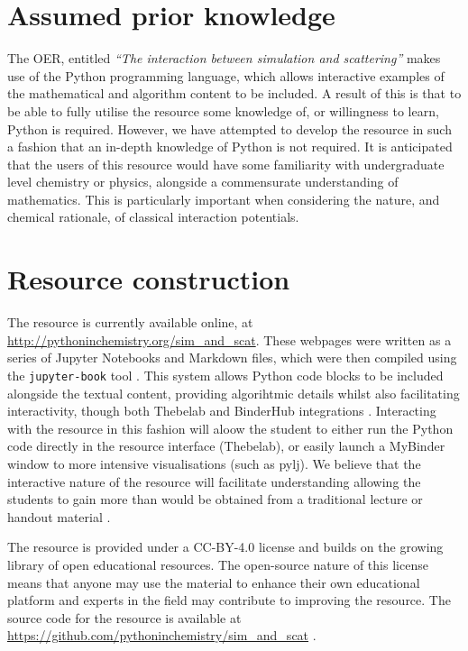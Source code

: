 \documentclass[amsmath,amssymb,twocolumn,superscriptaddress]{revtex4-1}
\begin{document}
\section{Assumed prior knowledge}

The OER, entitled \emph{``The interaction between simulation and scattering''} makes use of the Python programming language, which allows interactive examples of the mathematical and algorithm content to be included.
A result of this is that to be able to fully utilise the resource some knowledge of, or willingness to learn, Python is required.
However, we have attempted to develop the resource in such a fashion that an in-depth knowledge of Python is not required.
It is anticipated that the users of this resource would have some familiarity with undergraduate level chemistry or physics, alongside a commensurate understanding of mathematics.
This is particularly important when considering the nature, and chemical rationale, of classical interaction potentials.

\section{Resource construction}

The resource is currently available online, at \url{http://pythoninchemistry.org/sim_and_scat}.
These webpages were written as a series of Jupyter Notebooks and Markdown files, which were then compiled using the \texttt{jupyter-book} tool \cite{lau_jupyter/jupyter-book_2019}.
This system allows Python code blocks to be included alongside the textual content, providing algorihtmic details whilst also facilitating interactivity, though both Thebelab and BinderHub integrations \cite{ragan-kelley_minrk/thebelab_2019,ragan-kelley_jupyterhub/binderhub_2019,jupyter_binder_2018}.
Interacting with the resource in this fashion will aloow the student to either run the Python code directly in the resource interface (Thebelab), or easily launch a MyBinder window to more intensive visualisations (such as pylj).
We believe that the interactive nature of the resource will facilitate understanding allowing the students to gain more than would be obtained from a traditional lecture or handout material \cite{knuth_literate_1984}.

The resource is provided under a CC-BY-4.0 license \cite{noauthor_creative_2019} and builds on the growing library of open educational resources.
The open-source nature of this license means that anyone may use the material to enhance their own educational platform and experts in the field may contribute to improving the resource.
The source code for the resource is available at \url{https://github.com/pythoninchemistry/sim_and_scat} \cite{mccluskey_pythoninchemistry/sim_and_scat_2019}.
\end{document}
